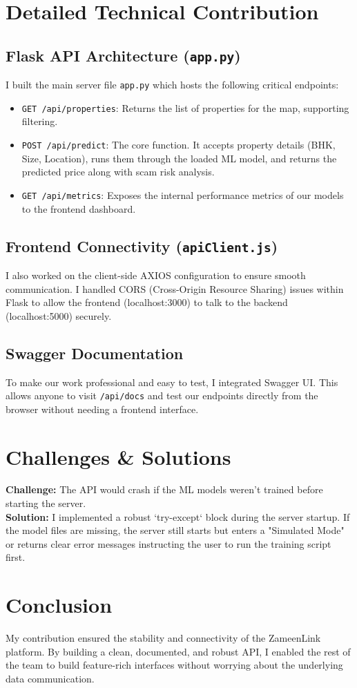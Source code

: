 \documentclass[12pt, a4paper]{article}
\begin{document}
\section{Detailed Technical Contribution}

\subsection{Flask API Architecture (\texttt{app.py})}
I built the main server file \texttt{app.py} which hosts the following critical endpoints:
\begin{itemize}
    \item \texttt{GET /api/properties}: Returns the list of properties for the map, supporting filtering.
    \item \texttt{POST /api/predict}: The core function. It accepts property details (BHK, Size, Location), runs them through the loaded ML model, and returns the predicted price along with scam risk analysis.
    \item \texttt{GET /api/metrics}: Exposes the internal performance metrics of our models to the frontend dashboard.
\end{itemize}

\subsection{Frontend Connectivity (\texttt{apiClient.js})}
I also worked on the client-side AXIOS configuration to ensure smooth communication. I handled CORS (Cross-Origin Resource Sharing) issues within Flask to allow the frontend (localhost:3000) to talk to the backend (localhost:5000) securely.

\subsection{Swagger Documentation}
To make our work professional and easy to test, I integrated Swagger UI. This allows anyone to visit \texttt{/api/docs} and test our endpoints directly from the browser without needing a frontend interface.

\section{Challenges \& Solutions}
\textbf{Challenge:} The API would crash if the ML models weren't trained before starting the server.\\
\textbf{Solution:} I implemented a robust `try-except` block during the server startup. If the model files are missing, the server still starts but enters a "Simulated Mode" or returns clear error messages instructing the user to run the training script first.

\section{Conclusion}
My contribution ensured the stability and connectivity of the ZameenLink platform. By building a clean, documented, and robust API, I enabled the rest of the team to build feature-rich interfaces without worrying about the underlying data communication.
\end{document}

